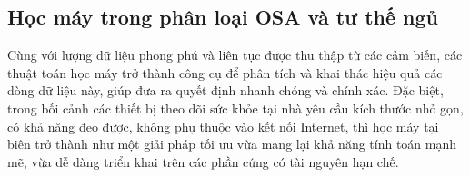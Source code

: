 \subsection{Học máy trong phân loại OSA và tư thế ngủ}

Cùng với lượng dữ liệu phong phú và liên tục được thu thập từ các cảm biến, các
thuật toán học máy trở thành công cụ để phân tích và khai thác hiệu quả các
dòng dữ liệu này, giúp đưa ra quyết định nhanh chóng và chính xác. Đặc biệt,
trong bối cảnh các thiết bị theo dõi sức khỏe tại nhà yêu cầu kích thước nhỏ
gọn, có khả năng đeo được, không phụ thuộc vào kết nối Internet, thì học máy
tại biên trở thành như một giải pháp tối ưu vừa mang lại khả năng tính toán
mạnh mẽ, vừa dễ dàng triển khai trên các phần cứng có tài nguyên hạn chế.
